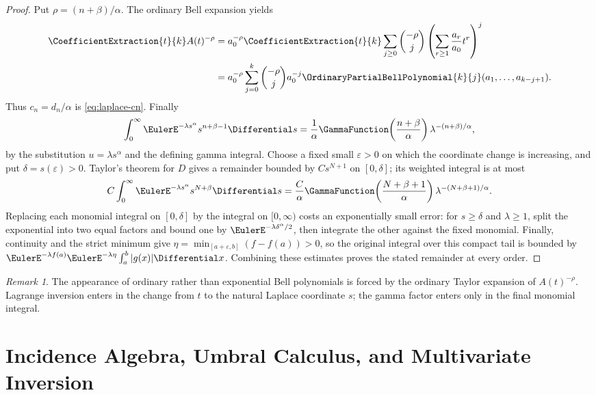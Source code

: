 \documentclass[11pt,a4paper,oneside,openany]{book}
\theoremstyle{definition}
\theoremstyle{remark}
\newtheorem{remark}[theorem]{Remark}
\begin{document}
\begin{proof}
Put $\rho=(n+\beta)/\alpha$.  The ordinary Bell expansion yields
\begin{align*}
 \CoefficientExtraction{t}{k}A(t)^{-\rho}
 &=a_0^{-\rho}\CoefficientExtraction{t}{k}
 \sum_{j\ge0}\binom{-\rho}{j}
 \left(\sum_{r\ge1}\frac{a_r}{a_0}t^r\right)^j\\
 &=a_0^{-\rho}\sum_{j=0}^{k}\binom{-\rho}{j}a_0^{-j}
 \OrdinaryPartialBellPolynomial{k}{j}(a_1,\ldots,a_{k-j+1}).
\end{align*}
Thus $c_n=d_n/\alpha$ is \eqref{eq:laplace-cn}.  Finally
\[
 \int_0^\infty \EulerE^{-\lambda s^\alpha}s^{n+\beta-1}\Differential s
 =\frac1\alpha\GammaFunction\!\left(\frac{n+\beta}{\alpha}\right)
 \lambda^{-(n+\beta)/\alpha},
\]
by the substitution $u=\lambda s^\alpha$ and the defining gamma integral.
Choose a fixed small $\varepsilon>0$ on which the coordinate change is
increasing, and put $\delta=s(\varepsilon)>0$.  Taylor's theorem for $D$
gives a remainder bounded by $Cs^{N+1}$ on $[0,\delta]$; its weighted
integral is at most
\[
 C\int_0^\infty \EulerE^{-\lambda s^\alpha}s^{N+\beta}\Differential s
 =\frac{C}{\alpha}
 \GammaFunction\!\left(\frac{N+\beta+1}{\alpha}\right)
 \lambda^{-(N+\beta+1)/\alpha}.
\]
Replacing each monomial integral on $[0,\delta]$ by the integral on
$[0,\infty)$ costs an exponentially small error: for $s\ge\delta$ and
$\lambda\ge1$, split the exponential into two equal factors and bound
one by $\EulerE^{-\lambda\delta^\alpha/2}$, then integrate the other
against the fixed monomial.  Finally, continuity and the strict minimum
give $\eta=\min_{[a+\varepsilon,b]}(f-f(a))>0$, so the original integral
over this compact tail is bounded by
$\EulerE^{-\lambda f(a)}\EulerE^{-\lambda\eta}\int_a^b|g(x)|\Differential x$.
Combining these estimates proves the stated remainder at every order.
\end{proof}

\begin{remark}
The appearance of ordinary rather than exponential Bell polynomials is forced by
the ordinary Taylor expansion of $A(t)^{-\rho}$.  Lagrange inversion enters in the
change from $t$ to the natural Laplace coordinate $s$; the gamma factor enters only
in the final monomial integral.
\end{remark}

\part{Incidence Algebra, Umbral Calculus, and Multivariate Inversion}
\end{document}
